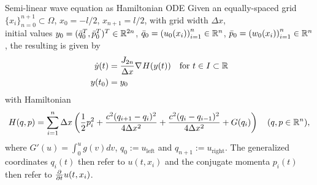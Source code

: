 \begin{frame}{Semi-linear wave equation as Hamiltonian ODE}
    Given an equally-spaced grid $\{ x_i \}_{n=0}^{n+1} \subset \Omega$, $x_0 = -l/2$, $x_{n+1} = l/2$,
    with grid width $\Delta x$,\\
    initial values $y_0 = (\bar{q}_0^T, \bar{p}_0^T)^T \in \mathbb{R}^{2n}$, $\bar{q}_0 = \left( u_0(x_i) \right)_{i=1}^n \in \mathbb{R}^n$, 
    $\bar{p}_0 = \left( w_0(x_i) \right)_{i=1}^n \in \mathbb{R}^n$,
    the resulting  is given by
    \begin{align*}
        \dot{y}(t) &= \frac{J_{2n}}{\Delta x} \nabla_{}{H}(y(t)) \quad \text{for } t \in I \subset \mathbb{R} \\
        y(t_0) &= y_0
    \end{align*}
    with Hamiltonian
    \begin{equation*}
        H(q,p) = \sum_{i=1}^n \Delta x \left( 
        \frac{1}{2} p_i^2 + \frac{c^2 (q_{i+1} - q_i)^2}{4 \Delta x^2} 
        + \frac{c^2 (q_i - q_{i-1})^2}{4 \Delta x^2} + G(q_i)
        \right)
        \quad (q,p \in \mathbb{R}^n)
        ,
    \end{equation*}
    where $G'(u) = \int_0^u g(v) dv$, $q_0 := u_{\text{left}}$ and $q_{n+1} := u_{\text{right}}$.
    The generalized coordinates $q_i(t)$ then refer to $u(t,x_i)$ and 
    the conjugate momenta $p_i(t)$ then refer to $\frac{\partial }{\partial t} u(t,x_i)$.
\end{frame}